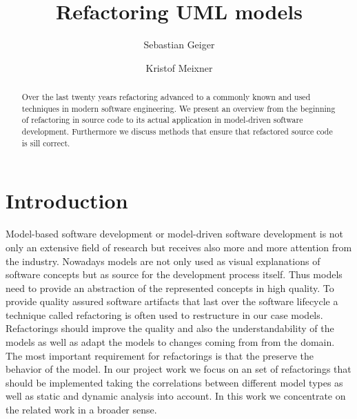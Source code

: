 \documentclass{llncs}
\begin{document}
\pagestyle{plain}

\title{Refactoring UML models}
\author{Sebastian Geiger \and Kristof Meixner}

\maketitle

\begin{abstract}
Over the last twenty years refactoring advanced to a commonly known and used techniques in modern software engineering. We present an overview from the beginning of refactoring in source code to its actual application in model-driven software development. Furthermore we discuss methods that ensure that refactored source code is sill correct.
\end{abstract}

\tableofcontents
\newpage


\section{Introduction}
\label{sec:intro}

Model-based software development or model-driven software development is not only an extensive field of research but receives also more and more attention from the industry. Nowadays models are not only used as visual explanations of software concepts but as source for the development process itself. Thus models need to provide an abstraction of
the represented concepts in high quality. To provide quality assured software artifacts that last over the software lifecycle a technique called refactoring is often used to restructure in our case models. Refactorings should improve the quality and also the understandability of the models as well as adapt the models to changes coming from from the domain. The most important requirement for refactorings is that the preserve the behavior of the model. In our project work we focus on an set of refactorings that should be implemented taking the correlations between different model types as well as static and dynamic analysis into account. In this work we concentrate on the related work in a broader sense.
\end{document}
